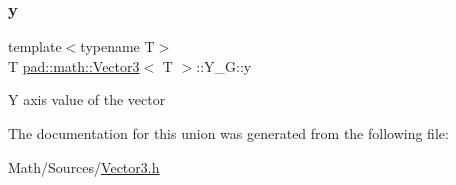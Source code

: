 \subsubsection{\texorpdfstring{y}{y}}
{\footnotesize\ttfamily template$<$typename T$>$ \\
T \mbox{\hyperlink{structpad_1_1math_1_1_vector3}{pad\+::math\+::\+Vector3}}$<$ T $>$\+::Y\+\_\+\+G\+::y}

Y axis value of the vector 

The documentation for this union was generated from the following file\+:\begin{DoxyCompactItemize}
\item 
Math/\+Sources/\mbox{\hyperlink{_vector3_8h}{Vector3.\+h}}\end{DoxyCompactItemize}
